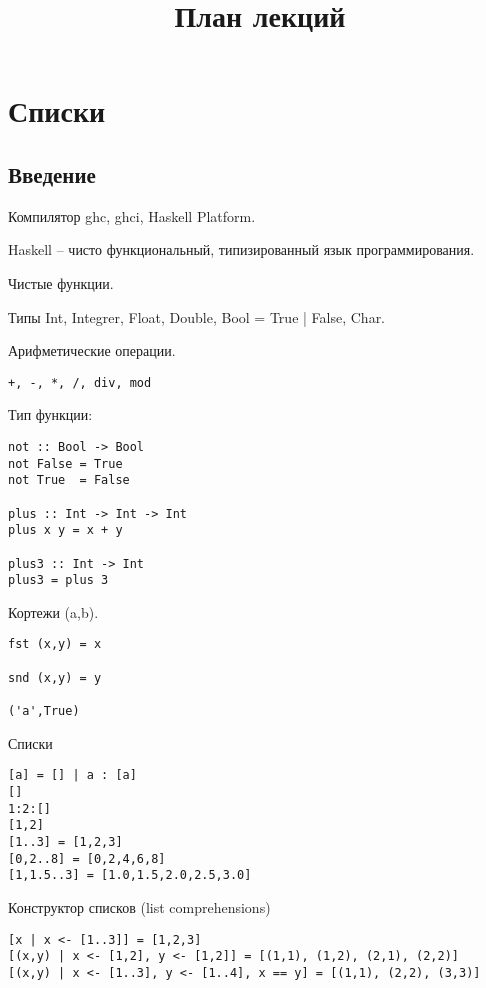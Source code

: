 \documentclass[a4paper,10pt]{article}
\begin{document}
\lstset{language=Haskell} 
\setcounter{secnumdepth}{0}
\title{План лекций}
\date{}
\maketitle

\section{Списки}
\subsection{Введение}
Компилятор ghc, ghci, Haskell Platform.

Haskell – чисто функциональный, типизированный язык программирования.

Чистые функции.

Типы Int, Integrer, Float, Double, Bool = True | False, Char.

Арифметические операции.
\begin{lstlisting}
+, -, *, /, div, mod
\end{lstlisting}

Тип функции:
\begin{lstlisting}
not :: Bool -> Bool
not False = True
not True  = False

plus :: Int -> Int -> Int
plus x y = x + y

plus3 :: Int -> Int
plus3 = plus 3
\end{lstlisting}

Кортежи (a,b).
\begin{lstlisting}
fst (x,y) = x

snd (x,y) = y

('a',True)
\end{lstlisting}

Списки
\begin{lstlisting}
[a] = [] | a : [a]
[]
1:2:[]
[1,2]
[1..3] = [1,2,3]
[0,2..8] = [0,2,4,6,8]
[1,1.5..3] = [1.0,1.5,2.0,2.5,3.0]
\end{lstlisting}

Конструктор списков (list comprehensions)
\begin{lstlisting}
[x | x <- [1..3]] = [1,2,3]
[(x,y) | x <- [1,2], y <- [1,2]] = [(1,1), (1,2), (2,1), (2,2)]
[(x,y) | x <- [1..3], y <- [1..4], x == y] = [(1,1), (2,2), (3,3)]
\end{lstlisting}

\clearpage
\end{document}
